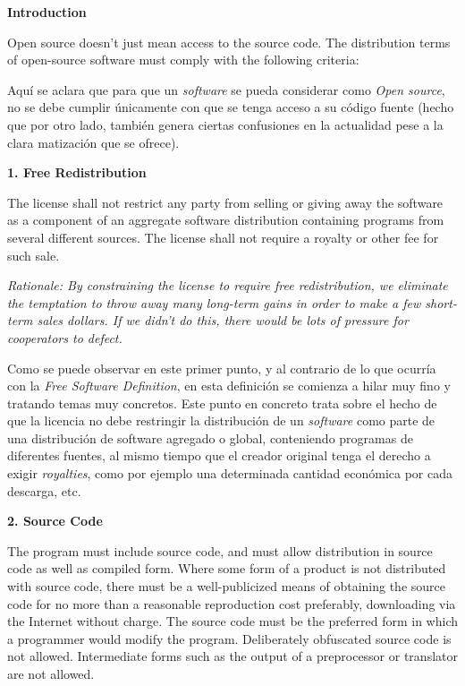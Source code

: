 {\bf Introduction

Open source doesn't just mean access to the source code. The distribution terms
of open-source software must comply with the following criteria:}\vspace{0.4cm}

Aquí se aclara que para que un \textit{software} se pueda considerar como
\textit{Open source}, no se debe cumplir únicamente con que se tenga acceso a su
código fuente (hecho que por otro lado, también genera ciertas confusiones en la
actualidad pese a la clara matización que se ofrece).\vspace{0.4cm}

{\bf 1. Free Redistribution

The license shall not restrict any party from selling or giving away the
software as a component of an aggregate software distribution containing
programs from several different sources. The license shall not require a royalty
or other fee for such sale.}

\textit{Rationale: By constraining the license to require free redistribution,
we eliminate the temptation to throw away many long-term gains in order to make
a few short-term sales dollars. If we didn't do this, there would be lots
of pressure for cooperators to defect.}\vspace{0.4cm}

Como se puede observar en este primer punto, y al contrario de lo que ocurría
con la \textit{Free Software Definition}, en esta definición se comienza a hilar
muy fino y tratando temas muy concretos. Este punto en concreto trata sobre
el hecho de que la licencia no debe restringir la distribución de un
\textit{software} como parte de una distribución de software agregado o global,
conteniendo programas de diferentes fuentes, al mismo tiempo que el creador
original tenga el derecho a exigir \textit{royalties}, como por ejemplo una
determinada cantidad económica por cada descarga, etc.\vspace{0.4cm}

{\bf 2. Source Code

The program must include source code, and must allow distribution in source code
as well as compiled form. Where some form of a product is not distributed with
source code, there must be a well-publicized means of obtaining the source code
for no more than a reasonable reproduction cost preferably, downloading via the
Internet without charge. The source code must be the preferred form in which a
programmer would modify the program. Deliberately obfuscated source code is not
allowed. Intermediate forms such as the output of a preprocessor or translator
are not allowed.}

